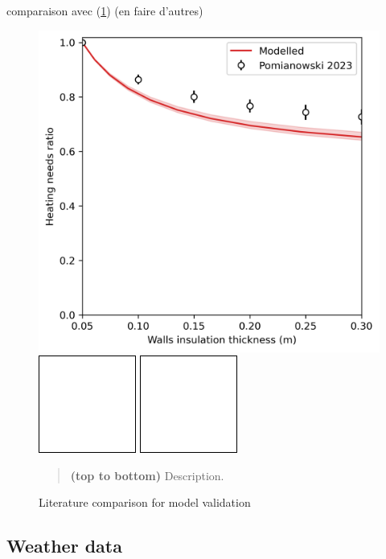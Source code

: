 \documentclass[11pt]{article}
\begin{document}
        comparaison avec \textcite{pomianowski_method_2023} (\ref{fig:model_validation}) (en faire d'autres)

        \begin{figure}[ht]
            \centering
            \includegraphics[width=0.32\columnwidth]{figures/effect_walls_insulation_heating_needs_litterature.png}
            \includegraphics[width=0.32\columnwidth]{figures/blank.png}
            \includegraphics[width=0.32\columnwidth]{figures/blank.png}
            \caption{\label{fig:model_validation} Literature comparison for model validation}
                \begin{quote}
                    \vspace{-2mm}
                    \small\noindent
                    \textbf{(top to bottom)} Description. 
                \end{quote}
        \end{figure}  
    


    \clearpage
    \subsection{Weather data} %
    \label{sub:weather_data}
\end{document}
